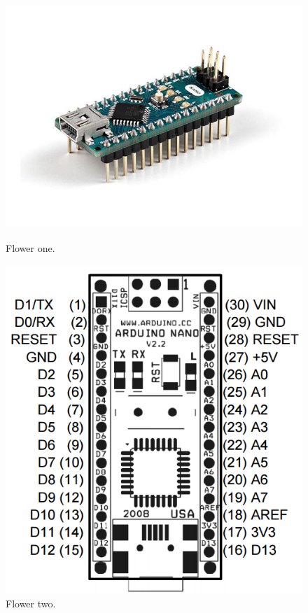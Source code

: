 \begin{figure}[h]
	\centering
	\begin{minipage}[b]{0.4\textwidth}
		\includegraphics[width=\textwidth]{img/hardware/nano-img.jpg}
		\caption{Flower one.}
	\end{minipage}
	\hfill
	\begin{minipage}[b]{0.3\textwidth}
		\includegraphics[width=\textwidth]{img/hardware/nano-esquema.png}
		\caption{Flower two.}
	\end{minipage}
\end{figure}


